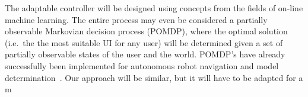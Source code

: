 \documentclass[format=sigconf, review=true, screen=true, anonymous=true]{acmart}
\begin{document}
The adaptable controller will be designed using concepts from the fields of on-line machine learning. The entire process may even be considered a partially observable Markovian decision process (POMDP), where the optimal solution (i.e.\ the the most suitable UI for any user) will be determined given a set of partially observable states of the user and the world. POMDP's have already successfully been implemented for autonomous robot navigation and model determination~\cite{ross2008bayesian}. Our approach will be similar, but it will have to be adapted for a m



\end{document}

